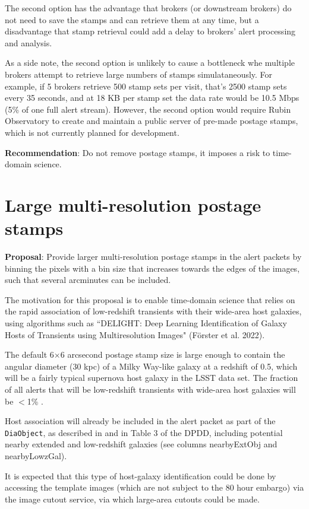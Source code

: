 \documentclass[DM,authoryear,toc]{lsstdoc}
\begin{document}
The second option has the advantage that brokers (or downstream brokers) do not need to save the stamps and can retrieve 
them at any time, but a disadvantage that stamp retrieval could add a delay to brokers' alert processing and analysis.

As a side note, the second option is unlikely to cause a bottleneck whe multiple brokers attempt to retrieve large numbers 
of stamps simulataneously.
For example, if 5 brokers retrieve 500 stamp sets per visit, that's 2500 stamp sets every 35 seconds, and at 18 KB 
per stamp set the data rate would be 10.5 Mbps (5\% of one full alert stream).
However, the second option would require Rubin Observatory to create and maintain a public server of 
pre-made postage stamps, which is not currently planned for development.

\textbf{Recommendation}: Do not remove postage stamps, it imposes a risk to time-domain science.


\section{Large multi-resolution postage stamps}\label{sec:bigstamps}

\textbf{Proposal}: Provide larger multi-resolution postage stamps in the alert packets by binning 
the pixels with a bin size that increases towards the edges of the images, such that several 
arcminutes can be included.

The motivation for this proposal is to enable time-domain science that relies on the rapid association 
of low-redshift transients with their wide-area host galaxies, using algorithms such as 
``DELIGHT: Deep Learning Identification of Galaxy Hosts of Transients using Multiresolution Images" (Förster et al. 2022).

The default 6$\times$6 arcsecond postage stamp size is large enough to contain the angular diameter (30 kpc) 
of a Milky Way-like galaxy at a redshift of 0.5, which will be a fairly typical supernova host galaxy in the LSST data set.
The fraction of all alerts that will be low-redshift transients with wide-area host galaxies will be $<$1\% .

Host association will already be included in the alert packet as part of the \texttt{DiaObject}, as described in  
and in Table 3 of the DPDD, including potential nearby extended and low-redshift galaxies (see columns nearbyExtObj and nearbyLowzGal).

It is expected that this type of host-galaxy identification could be done by accessing the template images 
(which are not subject to the 80 hour embargo) via the image cutout service, via which large-area cutouts could be made.
\end{document}
